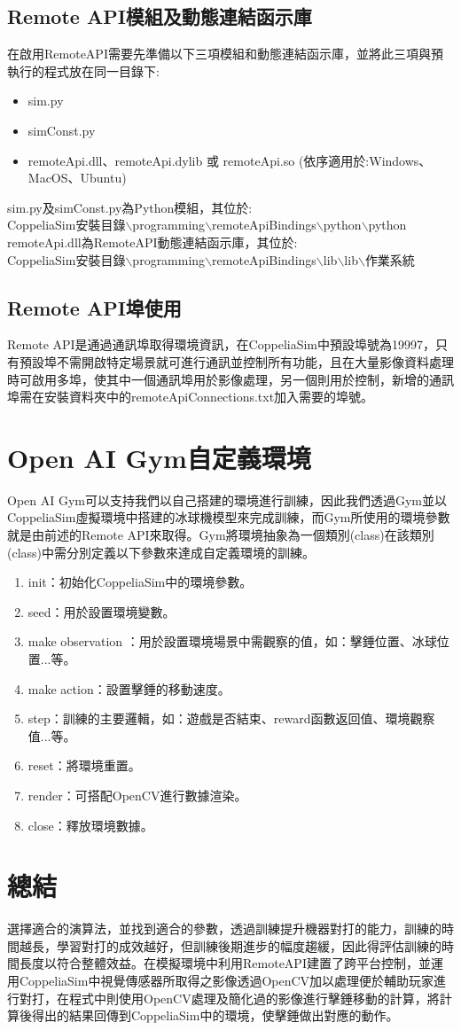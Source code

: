 \subsection{Remote API模組及動態連結函示庫}
在啟用RemoteAPI需要先準備以下三項模組和動態連結函示庫，並將此三項與預執行的程式放在同一目錄下:
\begin{itemize}
\item sim.py
\item simConst.py
\item remoteApi.dll、remoteApi.dylib 或 remoteApi.so (依序適用於:Windows、MacOS、Ubuntu)
\end{itemize}
sim.py及simConst.py為Python模組，其位於:\\
CoppeliaSim安裝目錄$\backslash$programming$\backslash$remoteApiBindings$\backslash$python$\backslash$python\\
remoteApi.dll為RemoteAPI動態連結函示庫，其位於:\\
CoppeliaSim安裝目錄$\backslash$programming$\backslash$remoteApiBindings$\backslash$lib$\backslash$lib$\backslash$作業系統\\
\subsection{Remote API埠使用}
Remote API是通過通訊埠取得環境資訊，在CoppeliaSim中預設埠號為19997，只有預設埠不需開啟特定場景就可進行通訊並控制所有功能，且在大量影像資料處理時可啟用多埠，使其中一個通訊埠用於影像處理，另一個則用於控制，新增的通訊埠需在安裝資料夾中的remoteApiConnections.txt加入需要的埠號。\\
\section{Open AI Gym自定義環境}
Open AI Gym可以支持我們以自己搭建的環境進行訓練，因此我們透過Gym並以CoppeliaSim虛擬環境中搭建的冰球機模型來完成訓練，而Gym所使用的環境參數就是由前述的Remote API來取得。Gym將環境抽象為一個類別(class)在該類別(class)中需分別定義以下參數來達成自定義環境的訓練。\\

\begin{enumerate}
\item init：初始化CoppeliaSim中的環境參數。
\item seed：用於設置環境變數。
\item make observation ：用於設置環境場景中需觀察的值，如：擊錘位置、冰球位置...等。
\item make action：設置擊錘的移動速度。
\item step：訓練的主要邏輯，如：遊戲是否結束、reward函數返回值、環境觀察值...等。
\item reset：將環境重置。
\item render：可搭配OpenCV進行數據渲染。
\item close：釋放環境數據。\\
\end{enumerate}

\section{總結}
選擇適合的演算法，並找到適合的參數，透過訓練提升機器對打的能力，訓練的時間越長，學習對打的成效越好，但訓練後期進步的幅度趨緩，因此得評估訓練的時間長度以符合整體效益。在模擬環境中利用RemoteAPI建置了跨平台控制，並運用CoppeliaSim中視覺傳感器所取得之影像透過OpenCV加以處理便於輔助玩家進行對打，在程式中則使用OpenCV處理及簡化過的影像進行擊錘移動的計算，將計算後得出的結果回傳到CoppeliaSim中的環境，使擊錘做出對應的動作。
\newpage
